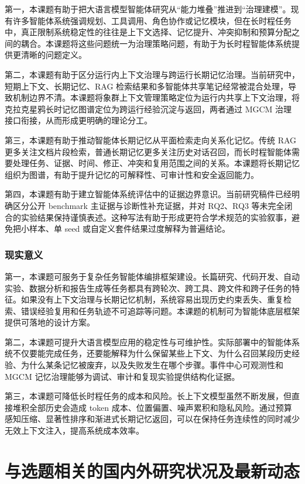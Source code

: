 \documentclass[UTF8,a4paper,zihao=-4,fontset=windows]{ctexart}
\begin{document}
第一，本课题有助于把大语言模型智能体研究从“能力堆叠”推进到“治理建模”。现有许多智能体系统强调规划、工具调用、角色协作或记忆模块，但在长时程任务中，真正限制系统稳定性的往往是上下文选择、记忆提升、冲突抑制和预算分配之间的耦合。本课题将这些问题统一为治理策略问题，有助于为长时程智能体系统提供更清晰的问题定义。

第二，本课题有助于区分运行内上下文治理与跨运行长期记忆治理。当前研究中，短期上下文、长期记忆、RAG 检索结果和多智能体共享笔记经常被混合处理，导致机制边界不清。本课题将象群上下文管理策略定位为运行内共享上下文治理，将克拉克星鸦长时记忆图谱定位为跨运行经验沉淀与返回，两者通过 MGCM 治理接口衔接，从而形成更明确的理论分工。

第三，本课题有助于推动智能体长期记忆从平面检索走向关系化记忆。传统 RAG 更多关注文档片段检索，普通长期记忆更多关注历史对话召回，而长时程智能体需要处理任务、证据、时间、修正、冲突和复用范围之间的关系。本课题将长期记忆组织为图谱，有助于提升记忆的可解释性、可审计性和安全返回能力。

第四，本课题有助于建立智能体系统评估中的证据边界意识。当前研究稿件已经明确区分公开 benchmark 主证据与诊断性补充证据，并对 RQ2、RQ3 等未完全闭合的实验结果保持谨慎表述。这种写法有助于形成更符合学术规范的实验叙事，避免把小样本、单 seed 或自定义套件结果过度解释为普遍结论。

\subsubsection{现实意义}

第一，本课题可服务于复杂任务智能体编排框架建设。长篇研究、代码开发、自动实验、数据分析和报告生成等任务都具有跨轮次、跨工具、跨文件和跨子任务的特征。如果没有上下文治理与长期记忆机制，系统容易出现历史约束丢失、重复检索、错误经验复用和任务轨迹不可追踪等问题。本课题的机制可为智能体底层框架提供可落地的设计方案。

第二，本课题可提升大语言模型应用的稳定性与可维护性。实际部署中的智能体系统不仅要能完成任务，还要能解释为什么保留某些上下文、为什么召回某段历史经验、为什么某条记忆被废弃，以及失败发生在哪个步骤。事件中心可观测性和 MGCM 记忆治理能够为调试、审计和复现实验提供结构化证据。

第三，本课题可降低长时程任务的成本和风险。长上下文模型虽然不断发展，但直接堆积全部历史会造成 token 成本、位置偏置、噪声累积和隐私风险。通过预算感知压缩、显著性排序和渐进式长期记忆返回，可以在保持任务连续性的同时减少无效上下文注入，提高系统成本效率。

\section{与选题相关的国内外研究状况及最新动态}
\end{document}
